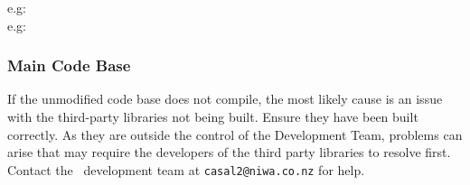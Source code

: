 e.g: \\
e.g: 

\subsubsection{Main Code Base}

If the unmodified code base does not compile, the most likely cause is an issue with the third-party libraries not being built. Ensure they have been built correctly. As they are outside the control of the Development Team, problems can arise that may require the developers of the third party libraries to resolve first. Contact the \CNAME\ development team at \texttt{casal2@niwa.co.nz} for help.



